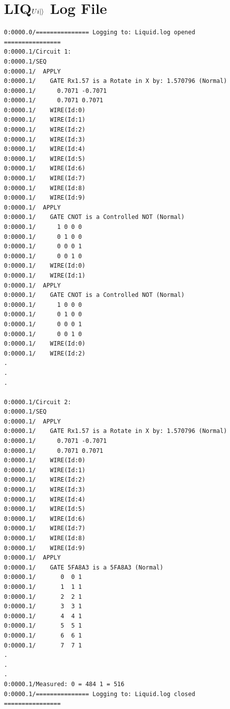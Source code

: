 \documentclass[12pt]{third-rep}
\begin{document}
\section{LIQ$Ui{\left\vert{}\right\rangle}$ Log File}
\begin{verbatim}
0:0000.0/=============== Logging to: Liquid.log opened ================
0:0000.1/Circuit 1:
0:0000.1/SEQ
0:0000.1/  APPLY
0:0000.1/    GATE Rx1.57 is a Rotate in X by: 1.570796 (Normal) 
0:0000.1/      0.7071 -0.7071 
0:0000.1/      0.7071 0.7071 
0:0000.1/    WIRE(Id:0)
0:0000.1/    WIRE(Id:1)
0:0000.1/    WIRE(Id:2)
0:0000.1/    WIRE(Id:3)
0:0000.1/    WIRE(Id:4)
0:0000.1/    WIRE(Id:5)
0:0000.1/    WIRE(Id:6)
0:0000.1/    WIRE(Id:7)
0:0000.1/    WIRE(Id:8)
0:0000.1/    WIRE(Id:9)
0:0000.1/  APPLY
0:0000.1/    GATE CNOT is a Controlled NOT (Normal) 
0:0000.1/      1 0 0 0 
0:0000.1/      0 1 0 0 
0:0000.1/      0 0 0 1 
0:0000.1/      0 0 1 0 
0:0000.1/    WIRE(Id:0)
0:0000.1/    WIRE(Id:1)
0:0000.1/  APPLY
0:0000.1/    GATE CNOT is a Controlled NOT (Normal) 
0:0000.1/      1 0 0 0 
0:0000.1/      0 1 0 0 
0:0000.1/      0 0 0 1 
0:0000.1/      0 0 1 0 
0:0000.1/    WIRE(Id:0)
0:0000.1/    WIRE(Id:2)
.
.
.

0:0000.1/Circuit 2:
0:0000.1/SEQ
0:0000.1/  APPLY
0:0000.1/    GATE Rx1.57 is a Rotate in X by: 1.570796 (Normal) 
0:0000.1/      0.7071 -0.7071 
0:0000.1/      0.7071 0.7071 
0:0000.1/    WIRE(Id:0)
0:0000.1/    WIRE(Id:1)
0:0000.1/    WIRE(Id:2)
0:0000.1/    WIRE(Id:3)
0:0000.1/    WIRE(Id:4)
0:0000.1/    WIRE(Id:5)
0:0000.1/    WIRE(Id:6)
0:0000.1/    WIRE(Id:7)
0:0000.1/    WIRE(Id:8)
0:0000.1/    WIRE(Id:9)
0:0000.1/  APPLY
0:0000.1/    GATE 5FA8A3 is a 5FA8A3 (Normal) 
0:0000.1/       0  0 1
0:0000.1/       1  1 1
0:0000.1/       2  2 1
0:0000.1/       3  3 1
0:0000.1/       4  4 1
0:0000.1/       5  5 1
0:0000.1/       6  6 1
0:0000.1/       7  7 1
.
.
.
0:0000.1/Measured: 0 = 484 1 = 516
0:0000.1/=============== Logging to: Liquid.log closed ================
\end{verbatim}
\end{document}
